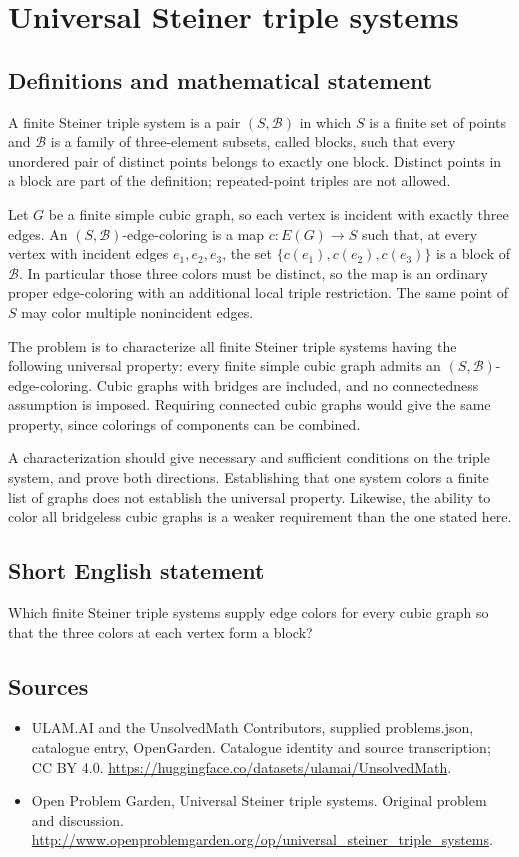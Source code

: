\documentclass[11pt,a4paper]{article}
\begin{document}
\section*{Universal Steiner triple systems}\label{statement}

\subsection{Definitions and mathematical statement}
A finite Steiner triple system is a pair $(S,\mathcal B)$ in which $S$ is a finite set of points and $\mathcal B$ is a family of three-element subsets, called blocks, such that every unordered pair of distinct points belongs to exactly one block. Distinct points in a block are part of the definition; repeated-point triples are not allowed.

Let $G$ be a finite simple cubic graph, so each vertex is incident with exactly three edges. An $(S,\mathcal B)$-edge-coloring is a map $c:E(G)\to S$ such that, at every vertex with incident edges $e_1,e_2,e_3$, the set $\{c(e_1),c(e_2),c(e_3)\}$ is a block of $\mathcal B$. In particular those three colors must be distinct, so the map is an ordinary proper edge-coloring with an additional local triple restriction. The same point of $S$ may color multiple nonincident edges.

The problem is to characterize all finite Steiner triple systems having the following universal property: every finite simple cubic graph admits an $(S,\mathcal B)$-edge-coloring. Cubic graphs with bridges are included, and no connectedness assumption is imposed. Requiring connected cubic graphs would give the same property, since colorings of components can be combined.

A characterization should give necessary and sufficient conditions on the triple system, and prove both directions. Establishing that one system colors a finite list of graphs does not establish the universal property. Likewise, the ability to color all bridgeless cubic graphs is a weaker requirement than the one stated here.
\subsection{Short English statement}
Which finite Steiner triple systems supply edge colors for every cubic graph so that the three colors at each vertex form a block?
\subsection{Sources}
\begin{itemize}
\item[S1] ULAM.AI and the UnsolvedMath Contributors, supplied problems.json, catalogue entry, OpenGarden. Catalogue identity and source transcription; CC BY 4.0.
\url{https://huggingface.co/datasets/ulamai/UnsolvedMath}.
\item[S2] Open Problem Garden, Universal Steiner triple systems. Original problem and discussion.
\url{http://www.openproblemgarden.org/op/universal_steiner_triple_systems}.
\end{itemize}
\end{document}
